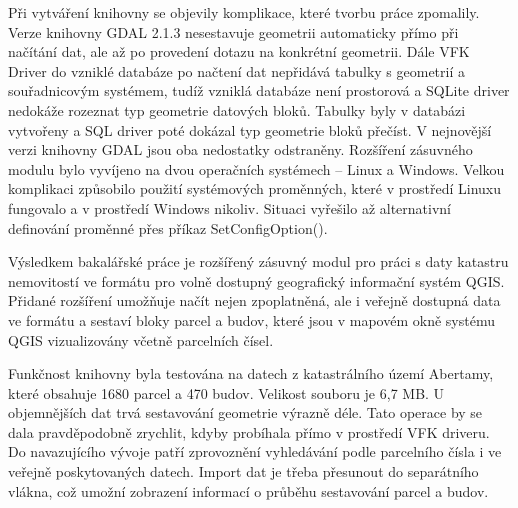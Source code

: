 Při vytváření knihovny se objevily komplikace, které tvorbu práce
zpomalily. Verze knihovny GDAL 2.1.3 nesestavuje geometrii automaticky
přímo při načítání dat, ale až po provedení dotazu na konkrétní
geometrii. Dále VFK Driver do vzniklé databáze po načtení dat
nepřidává tabulky s geometrií a souřadnicovým systémem, tudíž vzniklá
databáze není prostorová a SQLite driver nedokáže rozeznat typ geometrie datových
bloků. Tabulky byly v databázi vytvořeny a SQL driver poté dokázal typ
geometrie bloků přečíst. V nejnovější verzi knihovny GDAL jsou oba
nedostatky odstraněny. Rozšíření zásuvného modulu bylo vyvíjeno na
dvou operačních systémech -- Linux a Windows. Velkou komplikaci
způsobilo použití systémových proměnných, které v prostředí Linuxu
fungovalo a v prostředí Windows nikoliv. Situaci vyřešilo až
alternativní definování proměnné přes příkaz SetConfigOption().

Výsledkem bakalářské práce je rozšířený zásuvný modul pro práci s daty
katastru nemovitostí ve formátu  pro volně dostupný
geografický informační systém QGIS. Přidané rozšíření umožňuje načít
nejen zpoplatněná, ale i veřejně dostupná data ve formátu  a sestaví bloky
parcel a budov, které jsou v mapovém okně systému QGIS 
vizualizovány včetně parcelních čísel.

Funkčnost knihovny byla testována na datech z katastrálního území
Abertamy, které obsahuje 1680 parcel a 470 budov. Velikost 
souboru je 6,7 MB. U objemnějších dat trvá sestavování geometrie
výrazně déle. Tato operace by se dala pravděpodobně zrychlit, kdyby
probíhala přímo v
prostředí VFK driveru. Do navazujícího vývoje patří zprovoznění
vyhledávání podle parcelního čísla i ve veřejně poskytovaných
datech. Import dat je třeba přesunout do separátního vlákna, což
umožní zobrazení informací o průběhu sestavování parcel a budov.

